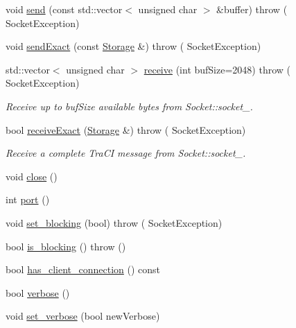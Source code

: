 \begin{DoxyCompactItemize}
void \hyperlink{classtcpip_1_1_socket_acb91f20e7a532159a8daa2796fa4abd4}{send} (const std\+::vector$<$ unsigned char $>$ \&buffer)  throw ( Socket\+Exception)
\item 
void \hyperlink{classtcpip_1_1_socket_a6d00027b40f48d4ae19e3fff2e89f7ab}{send\+Exact} (const \hyperlink{classtcpip_1_1_storage}{Storage} \&)  throw ( Socket\+Exception)
\item 
std\+::vector$<$ unsigned char $>$ \hyperlink{classtcpip_1_1_socket_a1da162e961fee9f1a1450df9700fd468}{receive} (int buf\+Size=2048)  throw ( Socket\+Exception)
\begin{DoxyCompactList}\small\item\em Receive up to {\ttfamily buf\+Size} available bytes from Socket\+::socket\+\_\+. \end{DoxyCompactList}\item 
bool \hyperlink{classtcpip_1_1_socket_a0d00337ac1fbad2cf183f0a651539e2e}{receive\+Exact} (\hyperlink{classtcpip_1_1_storage}{Storage} \&)  throw ( Socket\+Exception)
\begin{DoxyCompactList}\small\item\em Receive a complete Tra\+CI message from Socket\+::socket\+\_\+. \end{DoxyCompactList}\item 
void \hyperlink{classtcpip_1_1_socket_adda6f45e2b5fabc7f539f4ddcbe4b144}{close} ()
\item 
int \hyperlink{classtcpip_1_1_socket_ab7e67c84c32557ffb98d940081497d67}{port} ()
\item 
void \hyperlink{classtcpip_1_1_socket_ac382abc174bd18e4a61354cd857470c8}{set\+\_\+blocking} (bool)  throw ( Socket\+Exception)
\item 
bool \hyperlink{classtcpip_1_1_socket_a4a599332c62974235bde84f2145066b4}{is\+\_\+blocking} ()  throw ()
\item 
bool \hyperlink{classtcpip_1_1_socket_a78436cfed4ad686180491c38e88ebfc3}{has\+\_\+client\+\_\+connection} () const
\item 
bool \hyperlink{classtcpip_1_1_socket_a5633dda8e133b4eba9028b4e460b5587}{verbose} ()
\item 
void \hyperlink{classtcpip_1_1_socket_a695b2054effe2dfc2eddb12b7032b723}{set\+\_\+verbose} (bool new\+Verbose)
\end{DoxyCompactItemize}
